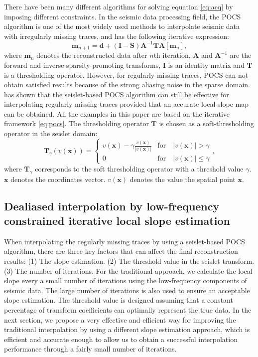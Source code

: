There have been many different algorithms for solving equation \ref{eq:acq} by imposing different constraints. In the seismic data processing field, the POCS algorithm \cite{abma2006} is one of the most widely used methods to interpolate seismic data with irregularly missing traces, and has the following iterative expression:
\begin{equation} 
\label{eq:pocs}
\mathbf{m}_{n+1}=\mathbf{d}+(\mathbf{I}-\mathbf{S})\mathbf{A}^{-1}\mathbf{T}\mathbf{A}[\mathbf{m}_n],
\end{equation}
where $\mathbf{m}_n$ denotes the reconstructed data after $n$th iteration, $\mathbf{A}$ and $\mathbf{A}^{-1}$ are the forward and inverse sparsity-promoting transforms, $\mathbf{I}$ is an identity matrix and $\mathbf{T}$ is a thresholding operator. However, for regularly missing traces, POCS can not obtain satisfied results because of the strong aliasing noise in the sparse domain. \cite{shuwei20153} has shown that the seislet-based POCS algorithm can still be effective for interpolating regularly missing traces provided that an accurate local slope map can be obtained. All the examples in this paper are based on the iterative framework \ref{eq:pocs}. The thresholding operator $\mathbf{T}$ is chosen as a soft-thresholding operator in the seislet domain:
\begin{equation}
\label{eq:soft}
\mathbf{T}_{\gamma}(v(\mathbf{x})) = \left\{ \begin{array}{ll}
v(\mathbf{x})-\gamma \frac{v(\mathbf{x})}{|v(\mathbf{x})|} & \text{for}\quad  |v(\mathbf{x})| > \gamma  \\
0			      & \text{for}\quad  |v(\mathbf{x})| \le \gamma
\end{array}\right.,
\end{equation}
where $\mathbf{T}_{\gamma}$ corresponds to the soft thresholding operator with a threshold value $\gamma$.  $\mathbf{x}$ denotes the coordinates vector. $v(\mathbf{x})$ denotes the value the spatial point $\mathbf{x}$.

\subsection{Dealiased interpolation by low-frequency constrained iterative local slope estimation}
 When interpolating the regularly missing traces by using a seislet-based POCS algorithm, there are three key factors that can affect the final reconstruction results: (1) The slope estimation. (2) The threshold value in the seislet transform. (3) The number of iterations. For the traditional approach, we calculate the local slope every a small number of iterations using the low-frequency components of seismic data. The large number of iterations is also used to ensure an acceptable slope estimation. The threshold value is designed assuming that a constant percentage of transform coefficients can optimally represent the true data. In the next section, we propose a very effective and efficient way for improving the traditional interpolation by using a different slope estimation approach, which is efficient and accurate enough to allow us to obtain a successful interpolation performance through a fairly small number of iterations. 

